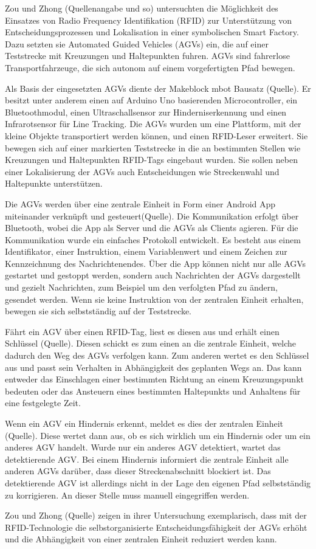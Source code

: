 Zou und Zhong (Quellenangabe und so) untersuchten die Möglichkeit des Einsatzes von Radio Frequency Identifikation (RFID) zur Unterstützung von Entscheidungsprozessen und Lokalisation in einer symbolischen Smart Factory. Dazu setzten sie Automated Guided Vehicles (AGVs) ein, die auf einer Teststrecke mit Kreuzungen und Haltepunkten fuhren. AGVs sind fahrerlose Transportfahrzeuge, die sich autonom auf einem vorgefertigten Pfad bewegen.

Als Basis der eingesetzten AGVs diente der Makeblock mbot Bausatz (Quelle). Er besitzt unter anderem einen auf Arduino Uno basierenden Microcontroller, ein Bluetoothmodul, einen Ultraschallsensor zur Hinderniserkennung und einen Infrarotsensor für Line Tracking. Die AGVs wurden um eine Plattform, mit der kleine Objekte transportiert werden können, und einen RFID-Leser erweitert. Sie bewegen sich auf einer markierten Teststrecke in die an bestimmten Stellen wie Kreuzungen und Haltepunkten RFID-Tags eingebaut wurden. Sie sollen neben einer Lokalisierung der AGVs auch Entscheidungen wie Streckenwahl und Haltepunkte unterstützen.

Die AGVs werden über eine zentrale Einheit in Form einer Android App miteinander verknüpft und gesteuert(Quelle). Die Kommunikation erfolgt über Bluetooth, wobei die App als Server und die AGVs als Clients agieren. Für die Kommunikation wurde ein einfaches Protokoll entwickelt. Es besteht aus einem Identifikator, einer Instruktion, einem Variablenwert und einem Zeichen zur Kennzeichnung des Nachrichtenendes. Über die App können nicht nur alle AGVs gestartet und gestoppt werden, sondern auch Nachrichten der AGVs dargestellt und gezielt Nachrichten, zum Beispiel um den verfolgten Pfad zu ändern, gesendet werden. Wenn sie keine Instruktion von der zentralen Einheit erhalten, bewegen sie sich selbstständig auf der Teststrecke. 

Fährt ein AGV über einen RFID-Tag, liest es diesen aus und erhält einen Schlüssel (Quelle). Diesen schickt es zum einen an die zentrale Einheit, welche dadurch den Weg des AGVs verfolgen kann. Zum anderen wertet es den Schlüssel aus und passt sein Verhalten in Abhängigkeit des geplanten Wegs an. Das kann entweder das Einschlagen einer bestimmten Richtung an einem Kreuzungspunkt bedeuten oder das Ansteuern eines bestimmten Haltepunkts und Anhaltens für eine festgelegte Zeit.

Wenn ein AGV ein Hindernis erkennt, meldet es dies der zentralen Einheit (Quelle). Diese wertet dann aus, ob es sich wirklich um ein Hindernis oder um ein anderes AGV handelt. Wurde nur ein anderes AGV detektiert, wartet das detektierende AGV. Bei einem Hindernis informiert die zentrale Einheit alle anderen AGVs darüber, dass dieser Streckenabschnitt blockiert ist. Das detektierende AGV ist allerdings nicht in der Lage den eigenen Pfad selbstständig zu korrigieren. An dieser Stelle muss manuell eingegriffen werden. 

Zou und Zhong (Quelle) zeigen in ihrer Untersuchung exemplarisch, dass mit der RFID-Technologie die selbstorganisierte Entscheidungsfähigkeit der AGVs erhöht und die Abhängigkeit von einer zentralen Einheit reduziert werden kann.